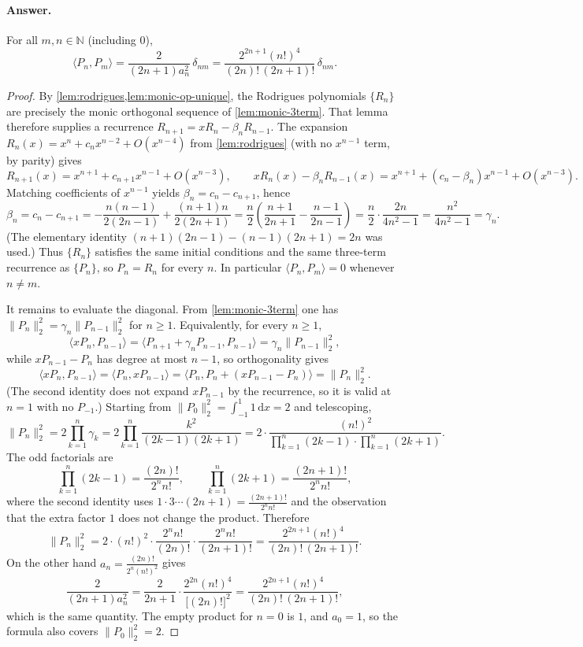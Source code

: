 \documentclass[11pt,a4paper]{article}
\begin{document}
\paragraph{Answer.}
For all \(m,n\in\mathbb{N}\) (including \(0\)),
\[
\langle P_{n},P_{m}\rangle
=
\frac{2}{(2n+1)a_{n}^{2}}\,\delta_{nm}
=
\frac{2^{2n+1}(n!)^{4}}{(2n)!\,(2n+1)!}\,\delta_{nm}.
\]

\begin{proof}
By \cref{lem:rodrigues,lem:monic-op-unique}, the Rodrigues polynomials \(\{R_{n}\}\) are precisely the monic orthogonal sequence of \cref{lem:monic-3term}. That lemma therefore supplies a recurrence \(R_{n+1}=xR_{n}-\beta_{n}R_{n-1}\). The expansion \(R_{n}(x)=x^{n}+c_{n}x^{n-2}+O(x^{n-4})\) from \cref{lem:rodrigues} (with no \(x^{n-1}\) term, by parity) gives
\[
R_{n+1}(x)
=
x^{n+1}+c_{n+1}x^{n-1}+O(x^{n-3}),
\qquad
xR_{n}(x)-\beta_{n}R_{n-1}(x)
=
x^{n+1}+(c_{n}-\beta_{n})x^{n-1}+O(x^{n-3}).
\]
Matching coefficients of \(x^{n-1}\) yields \(\beta_{n}=c_{n}-c_{n+1}\), hence
\[
\beta_{n}
=
c_{n}-c_{n+1}
=
-\frac{n(n-1)}{2(2n-1)}
+
\frac{(n+1)n}{2(2n+1)}
=
\frac{n}{2}
\left(
\frac{n+1}{2n+1}
-
\frac{n-1}{2n-1}
\right)
=
\frac{n}{2}\cdot\frac{2n}{4n^{2}-1}
=
\frac{n^{2}}{4n^{2}-1}
=
\gamma_{n}.
\]
(The elementary identity \((n+1)(2n-1)-(n-1)(2n+1)=2n\) was used.) Thus \(\{R_{n}\}\) satisfies the same initial conditions and the same three-term recurrence as \(\{P_{n}\}\), so \(P_{n}=R_{n}\) for every \(n\). In particular \(\langle P_{n},P_{m}\rangle=0\) whenever \(n\neq m\).

It remains to evaluate the diagonal. From \cref{lem:monic-3term} one has \(\|P_{n}\|_{2}^{2}=\gamma_{n}\|P_{n-1}\|_{2}^{2}\) for \(n\ge 1\). Equivalently, for every \(n\ge 1\),
\[
\langle xP_{n},P_{n-1}\rangle
=
\langle P_{n+1}+\gamma_{n}P_{n-1},P_{n-1}\rangle
=
\gamma_{n}\|P_{n-1}\|_{2}^{2},
\]
while \(xP_{n-1}-P_{n}\) has degree at most \(n-1\), so orthogonality gives
\[
\langle xP_{n},P_{n-1}\rangle
=
\langle P_{n},xP_{n-1}\rangle
=
\langle P_{n},P_{n}+(xP_{n-1}-P_{n})\rangle
=
\|P_{n}\|_{2}^{2}.
\]
(The second identity does not expand \(xP_{n-1}\) by the recurrence, so it is valid at \(n=1\) with no \(P_{-1}\).) Starting from \(\|P_{0}\|_{2}^{2}=\int_{-1}^{1}1\,\mathrm{d}x=2\) and telescoping,
\[
\|P_{n}\|_{2}^{2}
=
2\prod_{k=1}^{n}\gamma_{k}
=
2\prod_{k=1}^{n}\frac{k^{2}}{(2k-1)(2k+1)}
=
2\cdot
\frac{(n!)^{2}}{\displaystyle\prod_{k=1}^{n}(2k-1)\cdot\prod_{k=1}^{n}(2k+1)}.
\]
The odd factorials are
\[
\prod_{k=1}^{n}(2k-1)
=
\frac{(2n)!}{2^{n}n!},
\qquad
\prod_{k=1}^{n}(2k+1)
=
\frac{(2n+1)!}{2^{n}n!},
\]
where the second identity uses \(1\cdot 3\cdots(2n+1)=\frac{(2n+1)!}{2^{n}n!}\) and the observation that the extra factor \(1\) does not change the product. Therefore
\[
\|P_{n}\|_{2}^{2}
=
2\cdot(n!)^{2}\cdot\frac{2^{n}n!}{(2n)!}\cdot\frac{2^{n}n!}{(2n+1)!}
=
\frac{2^{2n+1}(n!)^{4}}{(2n)!\,(2n+1)!}.
\]
On the other hand \(a_{n}=\frac{(2n)!}{2^{n}(n!)^{2}}\) gives
\[
\frac{2}{(2n+1)a_{n}^{2}}
=
\frac{2}{2n+1}\cdot\frac{2^{2n}(n!)^{4}}{\bigl[(2n)!\bigr]^{2}}
=
\frac{2^{2n+1}(n!)^{4}}{(2n)!\,(2n+1)!},
\]
which is the same quantity. The empty product for \(n=0\) is \(1\), and \(a_{0}=1\), so the formula also covers \(\|P_{0}\|_{2}^{2}=2\).
\end{proof}
\end{document}
